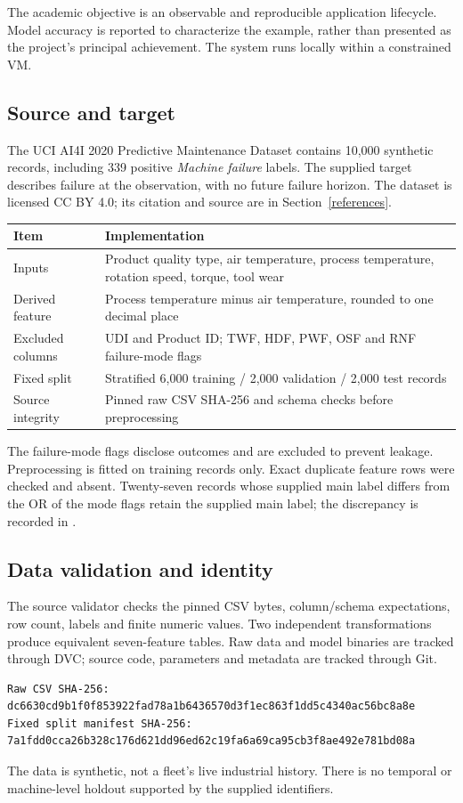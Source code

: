\documentclass[11pt,a4paper]{article}
\newcommand{\file}[1]{\path{#1}}
\newcommand{\lead}[1]{\par\vspace{4pt}\noindent\colorbox{pale}{\parbox{\dimexpr\linewidth-2\fboxsep}{\textcolor{ink}{#1}}}\par\vspace{6pt}}
\begin{document}
The academic objective is an observable and reproducible application lifecycle. Model accuracy is reported to characterize the example, rather than presented as the project's principal achievement. The system runs locally within a constrained VM.
\subsection{Source and target}
The UCI AI4I 2020 Predictive Maintenance Dataset contains 10,000 synthetic records, including 339 positive \emph{Machine failure} labels. The supplied target describes failure at the observation, with no future failure horizon. The dataset is licensed CC BY 4.0; its citation and source are in Section~\ref{references}.
\par
\begin{tabularx}{\linewidth}{@{}lY@{}}\toprule
Item & Implementation \\\midrule
Inputs & Product quality type, air temperature, process temperature, rotation speed, torque, tool wear \\
Derived feature & Process temperature minus air temperature, rounded to one decimal place \\
Excluded columns & UDI and Product ID; TWF, HDF, PWF, OSF and RNF failure-mode flags \\
Fixed split & Stratified 6,000 training / 2,000 validation / 2,000 test records \\
Source integrity & Pinned raw CSV SHA-256 and schema checks before preprocessing \\\bottomrule
\end{tabularx}
\par

The failure-mode flags disclose outcomes and are excluded to prevent leakage. Preprocessing is fitted on training records only. Exact duplicate feature rows were checked and absent. Twenty-seven records whose supplied main label differs from the OR of the mode flags retain the supplied main label; the discrepancy is recorded in \file{reports/data_audit.json}.
\subsection{Data validation and identity}
The source validator checks the pinned CSV bytes, column/schema expectations, row count, labels and finite numeric values. Two independent transformations produce equivalent seven-feature tables. Raw data and model binaries are tracked through DVC; source code, parameters and metadata are tracked through Git.
\begin{lstlisting}
Raw CSV SHA-256:
dc6630cd9b1f0f853922fad78a1b6436570d3f1ec863f1dd5c4340ac56bc8a8e
Fixed split manifest SHA-256:
7a1fdd0cca26b328c176d621dd96ed62c19fa6a69ca95cb3f8ae492e781bd08a
\end{lstlisting}
\lead{The data is synthetic, not a fleet's live industrial history. There is no temporal or machine-level holdout supported by the supplied identifiers.}
\clearpage
\end{document}
